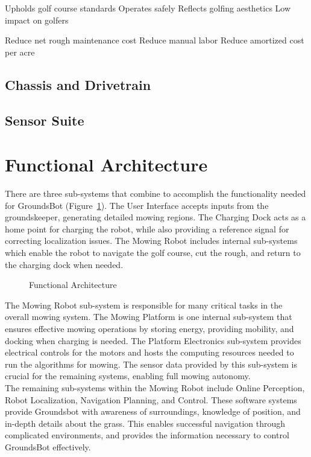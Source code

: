 \documentclass{article}
\begin{document}
Upholds golf course standards
  Operates safely 
  Reflects golfing aesthetics
  Low impact on golfers
  
Reduce net rough maintenance cost
  Reduce manual labor
  Reduce amortized cost per acre
  
\subsection{Chassis and Drivetrain}
\subsection{Sensor Suite}

\section{Functional Architecture}
  There are three sub-systems that combine to accomplish the functionality needed for GroundsBot (Figure~\ref{fig:functional}). The User Interface accepts inputs from the groundskeeper, generating detailed mowing regions. The Charging Dock acts as a home point for charging the robot, while also providing a reference signal for correcting localization issues. The Mowing Robot includes internal sub-systems which enable the robot to navigate the golf course, cut the rough, and return to the charging dock when needed.\\
  
\begin{figure}[H]
\centering
\def\svgwidth{\columnwidth}

\caption{Functional Architecture}
\label{fig:functional}
\end{figure}

  The Mowing Robot sub-system is responsible for many critical tasks in the overall mowing system. The Mowing Platform is one internal sub-system that ensures effective mowing operations by storing energy, providing mobility, and docking when charging is needed. The Platform Electronics sub-system provides electrical controls for the motors and hosts the computing resources needed to run the algorithms for mowing. The sensor data provided by this sub-system is crucial for the remaining systems, enabling full mowing autonomy.\\
  
  The remaining sub-systems within the Mowing Robot include Online Perception, Robot Localization, Navigation Planning, and Control. These software systems provide Groundsbot with awareness of surroundings, knowledge of position, and in-depth details about the grass. This enables successful navigation through complicated environments, and provides the information necessary to control GroundsBot effectively.\\
\end{document}
